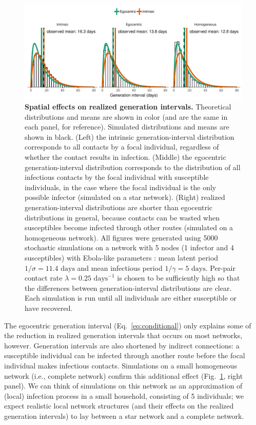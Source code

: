 \documentclass[12pt]{article}
\newcommand{\eref}[1]{Eq.~\ref{eq:#1}}
\newcommand{\fref}[1]{Fig.~\ref{fig:#1}}
\begin{document}
\begin{figure}[!ht]
\includegraphics[width=\textwidth]{../fig/local_effect.pdf}
\caption{
\textbf{Spatial effects on realized generation intervals.}
Theoretical distributions and means are shown in color (and are the same in each panel, for reference). Simulated distributions and means are shown in black.
(Left) the intrinsic generation-interval distribution corresponds to all contacts by a focal individual, regardless of whether the contact results in infection.
(Middle) the egocentric generation-interval distribution corresponds to the distribution of all infectious contacts by the focal individual with susceptible individuals, in the case where the focal individual is the only possible infector (simulated on a star network).
(Right) realized generation-interval distributions are shorter than egocentric distributions in general, because contacts can be wasted when susceptibles become infected through other routes (simulated on a homogeneous network).
All figures were generated using 5000 stochastic simulations on a network with 5 nodes (1 infector and 4 susceptibles) with Ebola-like parameters \citep{who2014ebola}:
mean latent period $1/\sigma = 11.4 \textrm{ days}$ and mean infectious period $1/\gamma = 5 \textrm{ days}$. 
Per-pair contact rate $\lambda = 0.25 \textrm{ days}^{-1}$ is chosen to be sufficiently high so that the differences between generation-interval distributions are clear.
Each simulation is run until all individuals are either susceptible or have recovered.
}
\label{fig:local}
\end{figure}

The egocentric generation interval (\eref{conditional}) only explains some of the reduction in realized generation intervals that occurs on most networks, however.
Generation intervals are also shortened by indirect connections: a susceptible individual can be infected through another route before the focal individual makes infectious contacts.
Simulations on a small homogeneous network (i.e., complete network) confirm this additional effect (\fref{local}, right panel). 
We can think of simulations on this network as an approximation of (local) infection process in a small household, consisting of 5 individuals;
we expect realistic local network structures (and their effects on the realized generation intervals) to lay between a star network and a complete network.
\end{document}
